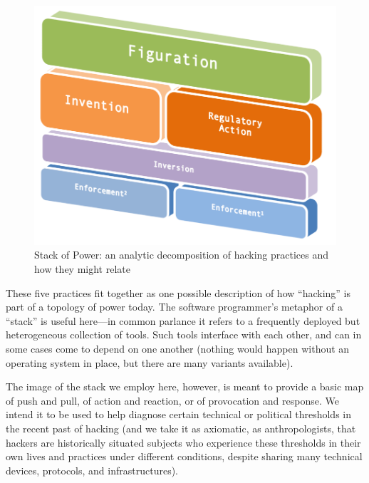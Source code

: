 \documentclass[10pt,letter,oneside]{scrartcl}
\begin{document}
\begin{figure} \centering \includegraphics[scale=0.5]{images/protocolstackV2}
\caption{Stack of Power: an analytic decomposition of hacking
practices and how they might relate} \label{fig:ProtocolStack} \end{figure}

These five practices fit together as one possible description of how ``hacking''
is part of a topology of power today.  The software programmer's metaphor
of a ``stack'' is useful here---in common parlance it refers to a frequently
deployed but heterogeneous collection of tools.  Such tools interface with each
other, and can in some cases come to depend on one another (nothing would happen
without an operating system in place, but there are many variants available).

The image of the stack we employ here, however, is meant to provide a basic map
of push and pull, of action and reaction, or of provocation and response.  We
intend it to be used to help diagnose certain technical or political thresholds
in the recent past of hacking (and we take it as axiomatic, as anthropologists, that
hackers are historically situated subjects who experience these thresholds in
their own lives and practices under different conditions, despite sharing many
technical devices, protocols, and infrastructures).   
\end{document}
